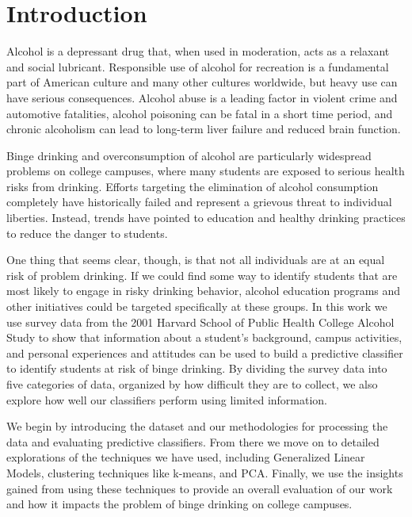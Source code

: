 \section{Introduction}
\label{sec:intro}

Alcohol is a depressant drug that, when used in moderation, acts as a relaxant and social lubricant.  Responsible use of alcohol for recreation is a fundamental part of American culture and many other cultures worldwide, but heavy use can have serious consequences.  Alcohol abuse is a leading factor in violent crime and automotive fatalities, alcohol poisoning can be fatal in a short time period, and chronic alcoholism can lead to long-term liver failure and reduced brain function.

Binge drinking and overconsumption of alcohol are particularly widespread problems on college campuses, where many students are exposed to serious health risks from drinking.  Efforts targeting the elimination of alcohol consumption completely have historically failed and represent a grievous threat to individual liberties.  Instead, trends have pointed to education and healthy drinking practices to reduce the danger to students.

One thing that seems clear, though, is that not all individuals are at an equal risk of problem drinking.  If we could find some way to identify students that are most likely to engage in risky drinking behavior, alcohol education programs and other initiatives could be targeted specifically at these groups.  In this work we use survey data from the 2001 Harvard School of Public Health College Alcohol Study to show that information about a student's background, campus activities, and personal experiences and attitudes can be used to build a predictive classifier to identify students at risk of binge drinking.  By dividing the survey data into five categories of data, organized by how difficult they are to collect, we also explore how well our classifiers perform using limited information.

We begin by introducing the dataset and our methodologies for processing the data and evaluating predictive classifiers.  From there we move on to detailed explorations of the techniques we have used, including Generalized Linear Models, clustering techniques like k-means, and PCA.  Finally, we use the insights gained from using these techniques to provide an overall evaluation of our work and how it impacts the problem of binge drinking on college campuses.
